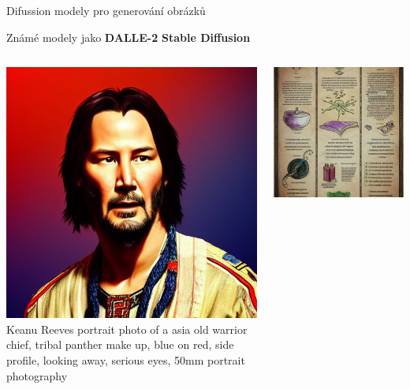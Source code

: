 \documentclass[aspectratio=169,dvipsnames]{beamer}
\begin{document}
\begin{frame}{Difussion modely pro generování obrázků}

    \centering

    Známé modely jako \textbf{DALLE-2} \textbf{Stable Diffusion} {\tiny \citep{ramesch2022hierarchical,rombach2022stableDifussion}}

    \begin{columns}[t]

            \centering
            \includegraphics[width=.7\textwidth]{img/stable_dif_keenu.jpg} \\

            \scriptsize Keanu Reeves portrait photo of a asia old
            warrior chief, tribal panther make up, blue on red, side profile,
            looking away, serious eyes, 50mm portrait photography
            \centering

            \includegraphics[width=.7\textwidth]{img/stable_dif_poison.jpg} \\


\end{columns}
\end{frame}
\end{document}
